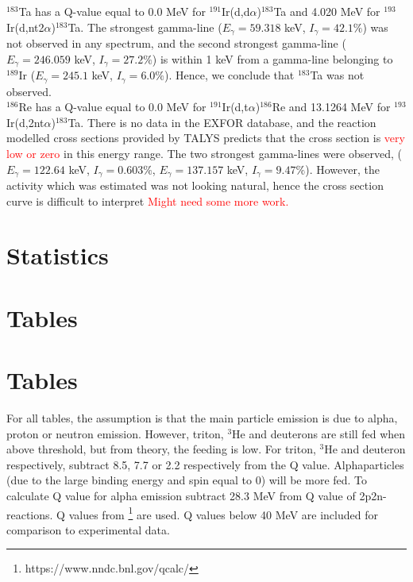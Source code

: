 \documentclass[a4paper,11pt,twoside]{book}
\begin{document}
\noindent $^{183}$Ta has a Q-value equal to 0.0 MeV for $^{191}$Ir(d,d$\alpha$)$^{183}$Ta and 4.020 MeV for $^{193}$Ir(d,nt2$\alpha$)$^{183}$Ta. The strongest gamma-line ($E_\gamma=59.318$ keV, $I_\gamma=42.1\%$) was not observed in any spectrum, and the second strongest gamma-line ($E_\gamma=246.059$ keV, $I_\gamma=27.2\%$) is within 1 keV from a gamma-line belonging to $^{189}$Ir ($E_\gamma=245.1$ keV, $I_\gamma=6.0\%$). Hence, we conclude that $^{183}$Ta was not observed. \\

\noindent $^{186}$Re has a Q-value equal to 0.0 MeV for $^{191}$Ir(d,t$\alpha$)$^{186}$Re and 13.1264 MeV for $^{193}$Ir(d,2nt$\alpha$)$^{183}$Ta. There is no data in the EXFOR database, and the reaction modelled cross sections provided by TALYS predicts that the cross section is \textcolor{red}{very low or zero} in this energy range. The two strongest gamma-lines were observed, ($E_\gamma=122.64$ keV, $I_\gamma=0.603\%$, $E_\gamma=137.157$ keV, $I_\gamma=9.47\%$). However, the activity which was estimated was not looking natural, hence the cross section curve is difficult to interpret \textcolor{red}{Might need some more work.} 



\appendix


\chapter{Statistics} \label{ch_app:statistics}

\chapter{Tables}

\chapter{Tables} \label{ch_app:tables}

For all tables, the assumption is that the main particle emission is due to alpha, proton or neutron emission. However, triton, $^3$He and deuterons are still fed when above threshold, but from theory, the feeding is low. For triton, $^{3}$He and deuteron respectively, subtract 8.5, 7.7 or 2.2 respectively from the Q value. Alphaparticles (due to the large binding energy and spin equal to 0) will be more fed. To calculate Q value for alpha emission subtract 28.3 MeV from Q value of 2p2n-reactions. Q values from  \footnote{https://www.nndc.bnl.gov/qcalc/} are used. Q values below 40 MeV are included for comparison to experimental data. 
\end{document}
